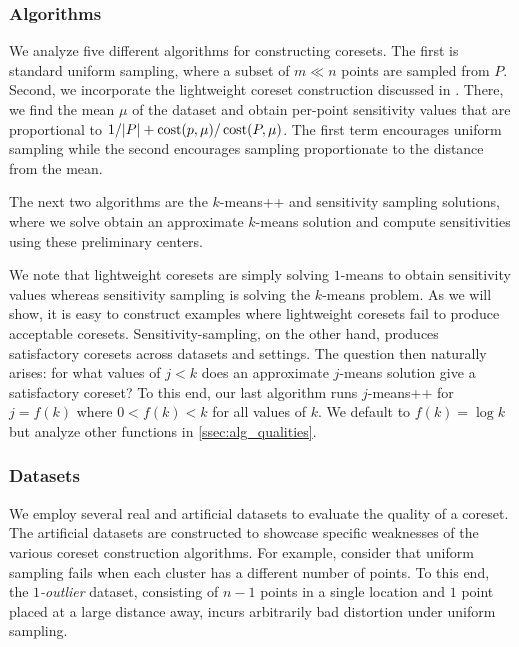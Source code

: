 
\subsubsection{Algorithms}

We analyze five different algorithms for constructing coresets. The first is standard uniform sampling, where a subset of $m \ll n$ points are sampled from $P$.
Second, we incorporate the lightweight coreset construction discussed in \cite{lightweight_coresets}. There, we find the mean $\mu$ of the dataset and obtain
per-point sensitivity values that are proportional to $1/|P| + \operatorname{cost}(p, \mu) / \operatorname{cost}(P, \mu)$. The first term encourages uniform sampling while the second
encourages sampling proportionate to the distance from the mean.

The next two algorithms are the $k$-means++ and \fkmeans sensitivity sampling solutions, where we solve obtain an approximate $k$-means solution and
compute sensitivities using these preliminary centers.

We note that lightweight coresets are simply solving $1$-means to obtain sensitivity values whereas sensitivity sampling is solving the $k$-means problem.  As
we will show, it is easy to construct examples where lightweight coresets fail to produce acceptable coresets. Sensitivity-sampling, on the other hand, produces
satisfactory coresets across datasets and settings. The question then naturally arises: for what values of $j < k$ does an approximate $j$-means solution give
a satisfactory coreset? To this end, our last algorithm runs $j$-means++ for $j = f(k)$ where $0 < f(k) < k$ for all values of $k$. We default to $f(k) = \log
k$ but analyze other functions in \ref{ssec:alg_qualities}.

\subsubsection{Datasets}

We employ several real and artificial datasets to evaluate the quality of a coreset.  The artificial datasets are constructed to showcase specific weaknesses of
the various coreset construction algorithms. For example, consider that uniform sampling fails when each cluster has a different number of points. To this end,
the \emph{$1$-outlier} dataset, consisting of $n-1$ points in a single location and $1$ point placed at a large distance away, incurs arbitrarily bad distortion
under uniform sampling. 


